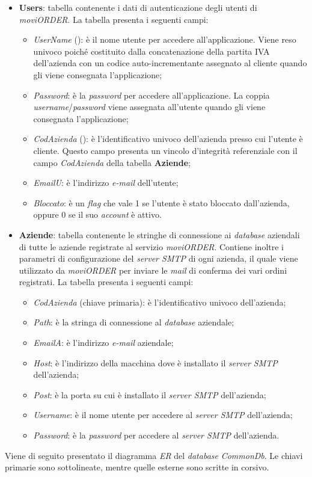 \begin{itemize}
	\item \textbf{Users}: tabella contenente i dati di autenticazione degli utenti di \textit{moviORDER}. La tabella presenta i seguenti campi:
		\begin{itemize}
			\item \textit{UserName} (): è il nome utente per accedere all'applicazione. Viene reso univoco poiché costituito dalla concatenazione della partita IVA dell'azienda con un codice auto-incrementante assegnato al cliente quando gli viene consegnata l'applicazione;
			\item \textit{Password}: è la \textit{password} per accedere all'applicazione. La coppia \textit{username}/\textit{password} viene assegnata all'utente quando gli viene consegnata l'applicazione;
			\item \textit{CodAzienda} (): è l'identificativo univoco dell'azienda presso cui l'utente è cliente. Questo campo presenta un vincolo d'integrità referenziale con il campo \textit{CodAzienda} della tabella \textbf{Aziende};
			\item \textit{EmailU}: è l'indirizzo \textit{e-mail} dell'utente;
			\item \textit{Bloccato}: è un \textit{flag} che vale 1 se l'utente è stato bloccato dall'azienda, oppure 0 se il suo \textit{account} è attivo.
		\end{itemize}
	\item \textbf{Aziende}: tabella contenente le stringhe di connessione ai \textit{database} aziendali di tutte le aziende registrate al servizio \textit{moviORDER}. Contiene inoltre i parametri di configurazione del \textit{server SMTP} di ogni azienda, il quale viene utilizzato da \textit{moviORDER} per inviare le \textit{mail} di conferma dei vari ordini registrati. La tabella presenta i seguenti campi:
	\begin{itemize}
		\item \textit{CodAzienda} (chiave primaria): è l'identificativo univoco dell'azienda;
		\item \textit{Path}: è la stringa di connessione al \textit{database} aziendale;
		\item \textit{EmailA}: è l'indirizzo \textit{e-mail} aziendale;
		\item \textit{Host}: è l'indirizzo della macchina dove è installato il \textit{server SMTP} dell'azienda;
		\item \textit{Post}: è la porta su cui è installato il \textit{server SMTP} dell'azienda;
		\item \textit{Username}: è il nome utente per accedere al \textit{server SMTP} dell'azienda;
		\item \textit{Password}: è la \textit{password} per accedere al \textit{server SMTP} dell'azienda.
	\end{itemize}
\end{itemize}
Viene di seguito presentato il diagramma \textit{ER} del \textit{database} \textit{CommonDb}. Le chiavi primarie sono sottolineate, mentre quelle esterne sono scritte in corsivo.

